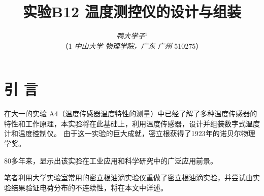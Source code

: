 \documentclass[10pt,a4paper,twocolumn,twoside,UTF8]{ctexart}
\begin{document}
\title{\LARGE\textbf{实验B12 温度测控仪的设计与组装}}
\author{\large\textit{鸭大学子}$^{1}$\\ \normalsize{（1 \textit{中山大学 物理学院，广东 广州 }510275）}}
\date{}%



\thispagestyle{firstpage}%
\pagestyle{maincontent}%



\section{引 \quad 言}
在大一的实验 A4（温度传感器温度特性的测量）\cite{shenhan2015}中已经了解了多种温度传感器的特性和工作原理，本实验将在此基础上，利用温度传感器，设计并组装数字式温度计和温度控制仪。
由于这一实验的巨大成就，密立根获得了1923年的诺贝尔物理学奖。\par
80多年来，显示出该实验在工业应用和科学研究中的广泛应用前景。\par
笔者利用大学实验室常用的密立根油滴实验仪重做了密立根油滴实验，并尝试由实验结果验证电荷分布的不连续性，将在本文中详述。
\end{document}
